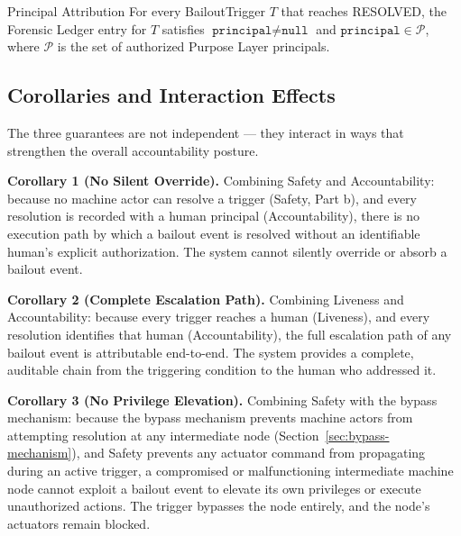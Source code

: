 \begin{invariant}{Principal Attribution}
\label{inv:principal-attribution}
For every BailoutTrigger $T$ that reaches RESOLVED, the Forensic Ledger entry for $T$ satisfies $\texttt{principal} \neq \texttt{null}$ and $\texttt{principal} \in \mathcal{P}$, where $\mathcal{P}$ is the set of authorized Purpose Layer principals.
\end{invariant}

\subsection{Corollaries and Interaction Effects}
\label{sec:guarantee-corollaries}

The three guarantees are not independent — they interact in ways that strengthen the overall accountability posture.

\bigskip

\noindent\textbf{Corollary 1 (No Silent Override).} Combining Safety and Accountability: because no machine actor can resolve a trigger (Safety, Part b), and every resolution is recorded with a human principal (Accountability), there is no execution path by which a bailout event is resolved without an identifiable human's explicit authorization. The system cannot silently override or absorb a bailout event.

\medskip

\noindent\textbf{Corollary 2 (Complete Escalation Path).} Combining Liveness and Accountability: because every trigger reaches a human (Liveness), and every resolution identifies that human (Accountability), the full escalation path of any bailout event is attributable end-to-end. The system provides a complete, auditable chain from the triggering condition to the human who addressed it.

\medskip

\noindent\textbf{Corollary 3 (No Privilege Elevation).} Combining Safety with the bypass mechanism: because the bypass mechanism prevents machine actors from attempting resolution at any intermediate node (Section~\ref{sec:bypass-mechanism}), and Safety prevents any actuator command from propagating during an active trigger, a compromised or malfunctioning intermediate machine node cannot exploit a bailout event to elevate its own privileges or execute unauthorized actions. The trigger bypasses the node entirely, and the node's actuators remain blocked.


